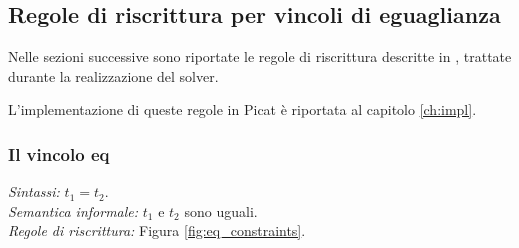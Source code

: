\documentclass[12pt,a4paper,openright]{book} %
\begin{document}
\subsection{Regole di riscrittura per vincoli di eguaglianza}
\label{subsec:clpbasedlang_lset_rewriteeq}


Nelle sezioni successive sono riportate le regole di riscrittura descritte in \cite{Rossi18}, trattate durante la realizzazione del solver.

L'implementazione di queste regole in Picat è riportata al capitolo \ref{ch:impl}.

\subsubsection{Il vincolo eq}

\textit{Sintassi:} $t_1 = t_2$.\\
\noindent\textit{Semantica informale:} $t_1$ e $t_2$ sono uguali.\\
\noindent\textit{Regole di riscrittura:} Figura \ref{fig:eq_constraints}.
\end{document}
